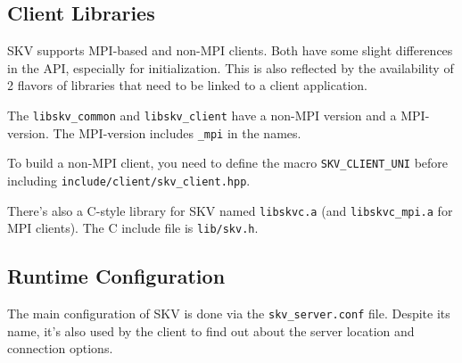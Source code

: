 \subsection{Client Libraries}\label{sec:config:libs}
SKV supports MPI-based and non-MPI clients.  Both have some slight
differences in the API, especially for initialization.  This is also
reflected by the availability of 2 flavors of libraries that need to
be linked to a client application.

The \verb|libskv_common| and \verb|libskv_client| have a non-MPI
version and a MPI-version.  The MPI-version includes \verb|_mpi| in
the names.

To build a non-MPI client, you need to define the macro
\verb|SKV_CLIENT_UNI| before including
\verb|include/client/skv_client.hpp|.


There's also a C-style library for SKV named \verb|libskvc.a| (and
\verb|libskvc_mpi.a| for MPI clients).  The C include file is
\verb|lib/skv.h|.


\subsection{Runtime Configuration}\label{sec:skv:config:run}
The main configuration of SKV is done via the \verb|skv_server.conf|
file.  Despite its name, it's also used by the client to find out
about the server location and connection options.

